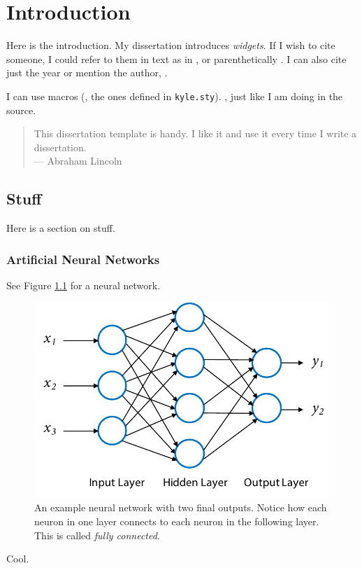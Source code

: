 \chapter{Introduction}

Here is the introduction. My dissertation introduces \emph{widgets}. If I wish
to cite someone, I could refer to them in text as in \citet{zongker2006chicken},
or parenthetically \citep{zongker2006chicken}. I can also cite just the
year \citeyearpar{zongker2006chicken} or mention the author,
\citeauthor{zongker2006chicken}.

I can use macros (\eg, the ones defined in \texttt{kyle.sty}). \Ie, just like
I am doing in the source.

\begin{quote}
This dissertation template is handy. I like it and use it every time I write a
dissertation.\\
\hspace*{\fill} --- Abraham Lincoln \citeyearpar{zongker2006chicken}
\end{quote}


\section{Stuff}
\label{sec:stuff}

Here is a section on stuff.

\subsection{Artificial Neural Networks}
\label{sec:neuralnet}

See Figure \ref{fig:neuralnet} for a neural network.

\begin{figure}[th]
	\begin{center}
	   \includegraphics[width=0.8\linewidth]{figures/neuralnet}
	\end{center}
	\caption[An example neural network with two final outputs]
		{An example neural network with two final outputs. Notice how each
		neuron in one layer connects to each neuron in the following layer. This
		is called \emph{fully connected}.}
	\label{fig:neuralnet}
\end{figure}

Cool.